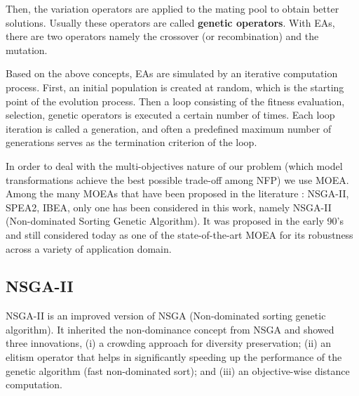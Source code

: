 \documentclass[conference]{IEEEtran}
\begin{document}
Then, the variation operators are applied to the mating pool to obtain better solutions. Usually these operators are called \textbf{genetic operators}. With EAs, there are two operators namely the crossover (or recombination) and the mutation.

Based on the above concepts, EAs are simulated by an iterative computation process. First, an initial population is created at random, which is the starting point of the evolution process. Then a loop consisting of the fitness evaluation, selection, genetic operators is executed a certain number of times. Each loop iteration is called a generation, and often a predefined maximum number of generations serves as the termination criterion of the loop.

In order to deal with the multi-objectives nature of our problem (which model transformations achieve the best possible trade-off among NFP) we use MOEA. 
Among the many MOEAs that have been proposed in the literature : NSGA-II\cite{Deb:2002:FEM:2221359.2221582}, SPEA2\cite{Zitzler01spea2:improving}, IBEA\cite{Zitzler04indicatorbasedselection}, only one has been considered in this work, namely NSGA-II (Non-dominated Sorting Genetic Algorithm). It was proposed in the early 90's and still considered today as one of the state-of-the-art MOEA for its robustness across a variety of application domain.

\subsection{NSGA-II}
NSGA-II is an improved version of NSGA\cite{Srinivas94multiobjectiveoptimization} (Non-dominated sorting genetic algorithm). It inherited the non-dominance concept from NSGA and showed three innovations, (i) a crowding approach for diversity preservation; (ii) an elitism operator that helps in significantly speeding up the performance of the genetic algorithm (fast non-dominated sort); and (iii) an objective-wise distance computation. 
\end{document}
